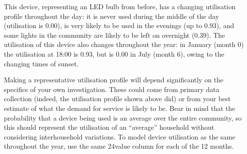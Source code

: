 \documentclass[letterpaper,10pt,english]{sphinxmanual}
\begin{document}
\begin{sphinxVerbatim}[commandchars=\\\{\}]
                        
                        
                        
                        
                        
                        
\end{sphinxVerbatim}

\sphinxAtStartPar
This device, representing an LED bulb from before, has a changing
utilisation profile throughout the day: it is never used during the
middle of the day (utilisation is 0.00), is very likely to be used in
the evenings (up to 0.93), and some lights in the community are likely
to be left on overnight (0.39). The utilisation of this device also
changes throughout the year: in January (month 0) the utilisation at
18:00 is 0.93, but is 0.00 in July (month 6), owing to the changing
times of sunset.

\sphinxAtStartPar
Making a representative utilisation profile will depend significantly on
the specifics of your own investigation. These could come from primary
data collection (indeed, the utilisation profile shown above did) or
from your best estimate of what the demand for service is likely to be.
Bear in mind that the probability that a device being used is an average
over the entire community, so this should represent the utilisation of
an “average” household without considering inter\sphinxhyphen{}household variations.
To model device utilisation as the same throughout the year, use the
same 24\sphinxhyphen{}value column for each of the 12 months.
\end{document}
